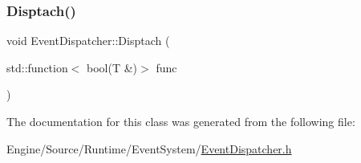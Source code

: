 \subsubsection{\texorpdfstring{Disptach()}{Disptach()}}
{\footnotesize\ttfamily void Event\+Dispatcher\+::\+Disptach (\begin{DoxyParamCaption}\item[{std\+::function$<$ bool(T \&)$>$}]{func }\end{DoxyParamCaption})\hspace{0.3cm}{\ttfamily [inline]}}



The documentation for this class was generated from the following file\+:\begin{DoxyCompactItemize}
\item 
Engine/\+Source/\+Runtime/\+Event\+System/\mbox{\hyperlink{_event_dispatcher_8h}{Event\+Dispatcher.\+h}}\end{DoxyCompactItemize}
